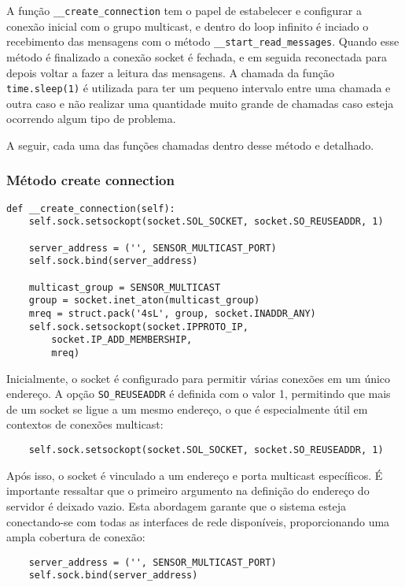 A função \texttt{\_\_create\_connection} tem o papel de estabelecer e configurar a conexão inicial com o grupo multicast, e dentro do loop infinito é inciado o recebimento das mensagens com o método \texttt{\_\_start\_read\_messages}. Quando esse método é finalizado a conexão socket é fechada, e em seguida reconectada para depois voltar a fazer a leitura das mensagens. A chamada da função \texttt{time.sleep(1)} é utilizada para ter um pequeno intervalo entre uma chamada e outra caso e não realizar uma quantidade muito grande de chamadas caso esteja ocorrendo algum tipo de problema.

A seguir, cada uma das funções chamadas dentro desse método e detalhado.


\subsubsection[Método create connection]{Método create connection}

\begin{verbatim}
def __create_connection(self):
    self.sock.setsockopt(socket.SOL_SOCKET, socket.SO_REUSEADDR, 1)

    server_address = ('', SENSOR_MULTICAST_PORT)
    self.sock.bind(server_address)

    multicast_group = SENSOR_MULTICAST
    group = socket.inet_aton(multicast_group)
    mreq = struct.pack('4sL', group, socket.INADDR_ANY)
    self.sock.setsockopt(socket.IPPROTO_IP,
        socket.IP_ADD_MEMBERSHIP,
        mreq)
\end{verbatim}

Inicialmente, o socket é configurado para permitir várias conexões em um único endereço. A opção \texttt{SO\_REUSEADDR} é definida com o valor 1, permitindo que mais de um socket se ligue a um mesmo endereço, o que é especialmente útil em contextos de conexões multicast:

\begin{verbatim}
    self.sock.setsockopt(socket.SOL_SOCKET, socket.SO_REUSEADDR, 1)
\end{verbatim}

Após isso, o socket é vinculado a um endereço e porta multicast específicos. É importante ressaltar que o primeiro argumento na definição do endereço do servidor é deixado vazio. Esta abordagem garante que o sistema esteja conectando-se com todas as interfaces de rede disponíveis, proporcionando uma ampla cobertura de conexão:

\begin{verbatim}
    server_address = ('', SENSOR_MULTICAST_PORT)
    self.sock.bind(server_address)
\end{verbatim}

